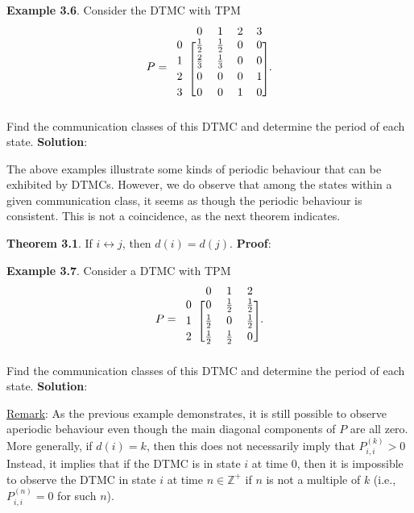 \begin{Example}
    \textbf{Example 3.6}. Consider the DTMC with TPM
    \[ P=\begin{blockarray}{cccccc}
            & 0 & 1 & 2 & 3 \\
            \begin{block}{c[ccccc]}
                0 & \frac{1}{2} & \frac{1}{2} & 0 & 0 \\[2pt]
                1 & \frac{2}{3} & \frac{1}{3} & 0 & 0 \\[2pt]
                2 & 0 & 0 & 0 & 1 \\[2pt]
                3 & 0 & 0 & 1 & 0\\
            \end{block}
        \end{blockarray}. \]
    Find the communication classes of this DTMC and determine the period of each state.
    \tcblower{}
    \textbf{Solution}:
\end{Example}
The above examples illustrate some kinds of periodic behaviour that can be exhibited by
DTMCs. However, we do observe that among the states within a given communication class,
it seems as though the periodic behaviour is consistent. This is not a coincidence, as the next
theorem indicates.
\begin{Result}
    \textbf{Theorem 3.1}. If $ i\leftrightarrow j $, then $ d(i)=d(j) $.
    \tcblower{}
    \textbf{Proof}:
\end{Result}
\begin{Example}
    \textbf{Example 3.7}. Consider a DTMC with TPM
    \[ P=\begin{blockarray}{ccccc}
            & 0 & 1 & 2 \\
            \begin{block}{c[cccc]}
                0 & 0 & \frac{1}{2}  & \frac{1}{2}\\[2pt]
                1 & \frac{1}{2} & 0 & \frac{1}{2}\\[2pt]
                2 & \frac{1}{2} & \frac{1}{2} & 0 \\
            \end{block}
        \end{blockarray}. \]
    Find the communication classes of this DTMC and determine the period of each state.
    \tcblower{}
    \textbf{Solution}:
\end{Example}
\underline{Remark}: As the previous example demonstrates, it is still possible to observe aperiodic
behaviour even though the main diagonal components of $P$ are all zero. More generally, if
$ d(i)=k $, then this does not necessarily imply that $ P_{i,i}^{(k)}>0 $ Instead, it implies that if the
DTMC is in state $i$ at time $0$, then it is impossible to observe the DTMC in state $i$ at time
$ n\in\mathbb{Z}^+ $ if $n$ is not a multiple of $k$ (i.e., $P_{i,i}^{(n)} = 0$ for such $n$).
